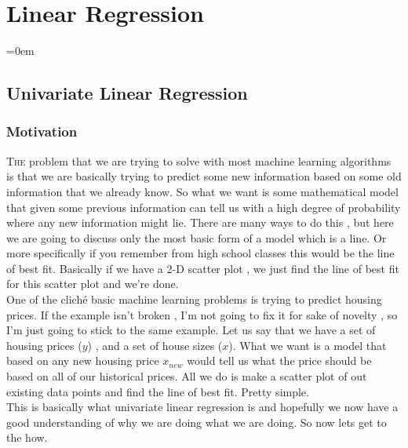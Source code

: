 
\section{Linear Regression}
\label{sec:linear_regression}
\parindent=0em

\subsection{Univariate Linear Regression}
\label{ssec:univariate_linear_regression}

\subsubsection{Motivation}
\label{sssec:motivation}


\lettrine[lines=3, findent=3pt, nindent=0pt]{T}{he} problem that we are trying
to solve with most machine learning algorithms is that we are basically trying
to predict some new information based on some old information that we already
know. So what we want is some mathematical model that given some previous
information can tell us with a high degree of probability where any new
information might lie. There are many ways to do this , but here we are going to
discuss only the most basic form of a model which is a line. Or more
specifically if you remember from high school classes this would be the line of
best fit. Basically if we have a 2-D scatter plot , we just find the line of
best fit for this scatter plot and we're done.\\

One of the cliché basic machine learning problems is trying to predict housing
prices. If the example isn't broken , I'm not going to fix it for sake of novelty
, so I'm just going to stick to the same example. Let us say that we have a set
of housing prices ($y$) , and a set of house sizes ($x$). What we want is a
model that based on any new housing price $x_{new}$ would tell us what the price
should be based on all of our historical prices. All we do is make a scatter
plot of out existing data points and find the line of best fit. Pretty
simple.\\

This is basically what univariate linear regression is and hopefully we now have
a good understanding of why we are doing what we are doing. So now lets get to
the how.\\

